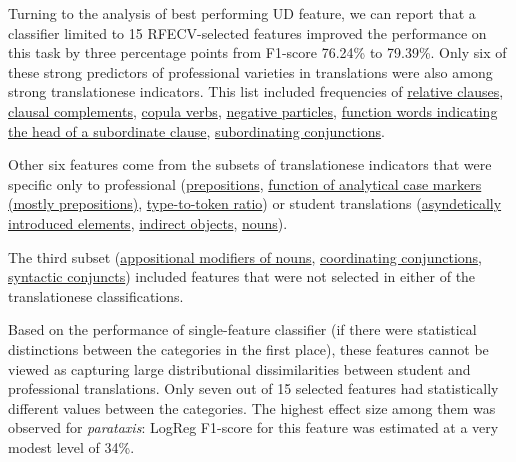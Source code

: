 
Turning to the analysis of best performing UD feature, we can report that a classifier limited to \hypertarget{wd:15best-var}{15 RFECV-selected features} improved the performance on this task by three percentage points from F1-score 76.24\% to 79.39\%. %
Only six of these strong predictors of professional varieties in translations were also among strong translationese indicators. This list included frequencies of \hyperlink{acl:relcl}{relative clauses}, \hyperlink{ccomp}{clausal complements}, \hyperlink{copula}{copula verbs}, \hyperlink{neg}{negative particles}, \hyperlink{mark}{function words indicating the head of a subordinate clause}, \hyperlink{sconj}{subordinating conjunctions}.

Other six features come from the subsets of translationese indicators that were specific only to professional (\hyperlink{adp}{prepositions}, \hyperlink{case}{function of analytical case markers (mostly prepositions)}, \hyperlink{content\_TTR}{type-to-token ratio}) or student translations (\hyperlink{parataxis}{asyndetically introduced elements}, \hyperlink{iobj}{indirect objects}, \hyperlink{nn}{nouns}).

The third subset (\hyperlink{appos}{appositional modifiers of nouns}, \hyperlink{cconj}{coordinating conjunctions}, \hyperlink{conj}{syntactic conjuncts}) included features that were not selected in either of the translationese classifications.

Based on the performance of single-feature classifier (if there were statistical distinctions between the categories in the first place), these features cannot be viewed as capturing large distributional dissimilarities between student and professional translations. 
Only seven out of 15 selected features had statistically different values between the categories. The highest effect size among them was observed for \textit{parataxis}: LogReg F1-score for this feature was estimated at a very modest level of 34\%. 


